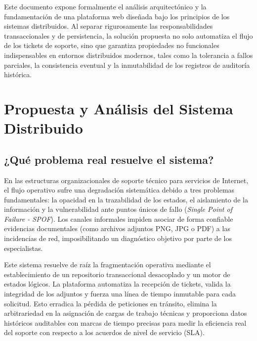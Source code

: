 \documentclass[12pt,letterpaper]{article}
\begin{document}
Este documento expone formalmente el análisis arquitectónico y la fundamentación de una plataforma web diseñada bajo los principios de los sistemas distribuidos. Al separar rigurosamente las responsabilidades transaccionales y de persistencia, la solución propuesta no solo automatiza el flujo de los tickets de soporte, sino que garantiza propiedades no funcionales indispensables en entornos distribuidos modernos, tales como la tolerancia a fallos parciales, la consistencia eventual y la inmutabilidad de los registros de auditoría histórica.

\newpage
\section{Propuesta y Análisis del Sistema Distribuido}

\subsection{¿Qué problema real resuelve el sistema?}
En las estructuras organizacionales de soporte técnico para servicios de Internet, el flujo operativo sufre una degradación sistemática debido a tres problemas fundamentales: la opacidad en la trazabilidad de los estados, el aislamiento de la información y la vulnerabilidad ante puntos únicos de fallo (\textit{Single Point of Failure - SPOF}). Los canales informales impiden asociar de forma confiable evidencias documentales (como archivos adjuntos PNG, JPG o PDF) a las incidencias de red, imposibilitando un diagnóstico objetivo por parte de los especialistas.

Este sistema resuelve de raíz la fragmentación operativa mediante el establecimiento de un repositorio transaccional desacoplado y un motor de estados lógicos. La plataforma automatiza la recepción de tickets, valida la integridad de los adjuntos y fuerza una línea de tiempo inmutable para cada solicitud. Esto erradica la pérdida de peticiones en tránsito, elimina la arbitrariedad en la asignación de cargas de trabajo técnicas y proporciona datos históricos auditables con marcas de tiempo precisas para medir la eficiencia real del soporte con respecto a los acuerdos de nivel de servicio (SLA).
\end{document}
